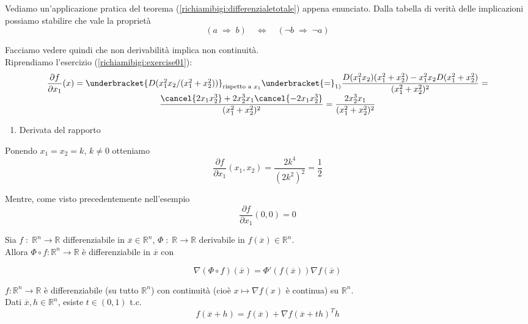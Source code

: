 \begin{example}
Vediamo un'applicazione pratica del teorema
 (\ref{richiamibigi:differenzialetotale}) appena enunciato. 
Dalla tabella di verit\`a delle implicazioni  possiamo stabilire 
che vale la propriet\`a
$$
 (a \; \Longrightarrow \; b ) \quad
\Longleftrightarrow \quad
(\neg b \; \Longrightarrow \;  \neg a )
$$

Facciamo vedere quindi che non derivabilit\`a implica
non continuit\`a. \\
Riprendiamo l'esercizio (\ref{richiamibigi:exercise01}):
$$
\begin{array}{c}
\dfrac{\partial f}{\partial x_1}(x) =
\underbracket{D(x_1^2 x_2 / (x_1^2 + x_2^2))}_{\text{rispetto a } x_1} 
\underbracket{=}_{1)}
\dfrac{
D(x_1^2 x_2 ) (x_1^2 + x_2^2) 
-
x_1^2 x_2  D(x_1^2 + x_2^2) 
} { (x_1^2 + x_2^2)^{2}} =   \\
 \dfrac{ \cancel{2x_1 x_2^{3}}
+2x_2^{3} x_1   \cancel{ - 2x_1 x_2^{3}}
}{(x_1^{2} + x_2^{2})^{2}} 
=
\dfrac{2x_2^{3} x_1 }{(x_1^{2} + x_2^{2})^{2}} 
\end{array}
$$
\begin{enumerate}
\item Derivata del rapporto
\end{enumerate}
Ponendo $x_1 = x_2 = k$, $k \neq 0$ otteniamo
$$
\dfrac{\partial f}{\partial x_1}(x_1,x_2) =
\dfrac{2k^{4}}{(2k^{2})^{2}} = \dfrac{1}{2}$$ 

Mentre, come visto precedentemente nell'esempio
$$\dfrac{\partial f}{\partial x_1}(0,0) = 0$$
\end{example}

\begin{property}
Sia
$f\; : \; \mathbb{R}^n \to \mathbb{R}$  differenziabile in
$ \overline{x} \in \mathbb{R}^n$,
$\Phi \; : \;  \mathbb{R} \to \mathbb{R} $ derivabile in 
$f(\overline{x}) \in \mathbb{R}^n$. \\
Allora
$\Phi \circ f:\mathbb{R}^n \to \mathbb{R}$ è differenziabile in 
$\overline{x}$ con

$$  \nabla(\Phi \circ f)(\overline{x}) = 
\Phi'(f(\overline{x})) \nabla f(\overline{x})$$
\end{property}

\begin{theo}
$f:\mathbb{R}^n \to \mathbb{R}$ è differenziabile (su tutto $\mathbb{R}^n$)
con continuità (cioè $x \mapsto \nabla f(x)$ è continua)
su $\mathbb{R}^{n}$. \\
Dati $\overline{x}, h \in \mathbb{R}^n$, esiste $t \in (0,1)$ t.c.
 $$f(\overline{x}+h) = f(\overline{x}) + \nabla f(\overline{x} + th)^T h$$
\end{theo}

